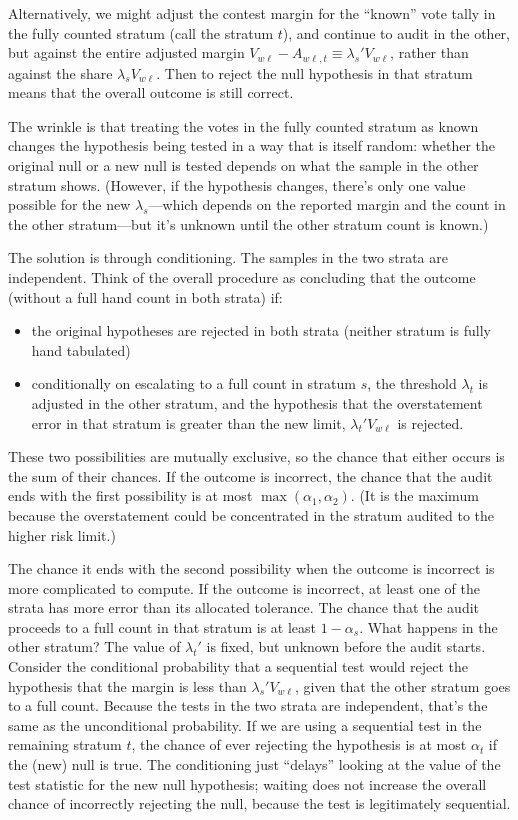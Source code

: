 Alternatively, we might adjust the contest margin for the ``known'' vote tally in the
fully counted stratum (call the stratum $t$), and continue to audit in the other, but against the entire adjusted
margin $V_{w\ell} - A_{w\ell,t} \equiv \lambda_s' V_{w\ell}$, rather than 
against the share $\lambda_s V_{w\ell}$.
Then to reject the null hypothesis in that stratum means that the overall outcome is still correct.

The wrinkle is that treating the votes
in the fully counted stratum as known changes the hypothesis being tested in a way that is itself random:
whether the original null or a new null is tested depends on what the sample in the other stratum
shows.
(However, if the hypothesis changes, there's only one value possible for the new $\lambda_s$---which
depends on the reported margin and the count in the other stratum---but it's unknown 
until the other stratum count is known.)

The solution is through conditioning. The samples in the two strata are independent. 
Think of the overall procedure as concluding that the outcome (without a full
hand count in both strata) if:

\begin{itemize}
   \item the original hypotheses are rejected in both strata (neither stratum is fully hand tabulated)
   \item conditionally on escalating to a full count in stratum $s$, the threshold $\lambda_t$
            is adjusted in the other stratum, and the hypothesis that the overstatement error
            in that stratum is greater than the new limit, $\lambda_t' V_{w\ell}$ is rejected. 
\end{itemize}

These two possibilities are mutually exclusive, so the chance that either occurs is the
sum of their chances.
If the outcome is incorrect, the chance that the audit ends with the first possibility is at most
$\max (\alpha_1, \alpha_2)$.
(It is the maximum because the overstatement could be concentrated in the stratum audited to
the higher risk limit.)

The chance it ends with the second possibility when the outcome is incorrect 
is more complicated to compute.
If the outcome is incorrect, at least one of the strata has more error than its allocated tolerance.
The chance that the audit proceeds to a full count in that stratum is at least $1-\alpha_s$. 
What happens in the other stratum?
The value of $\lambda_t'$ is fixed, but unknown before the audit starts.
Consider the conditional probability that a sequential test would reject the hypothesis that the margin is less than $\lambda_s' V_{w\ell}$, given that the other stratum goes to a full count. 
Because the tests in the two strata are independent, that's the same as the unconditional probability. 
If we are using a sequential test in the remaining stratum $t$, the chance of ever rejecting the 
hypothesis is at most $\alpha_t$ if the (new) null is true. 
The conditioning just ``delays'' looking at the value of the test statistic for the new null hypothesis; waiting does not increase the overall chance of incorrectly rejecting the null, 
because the test is legitimately sequential.

